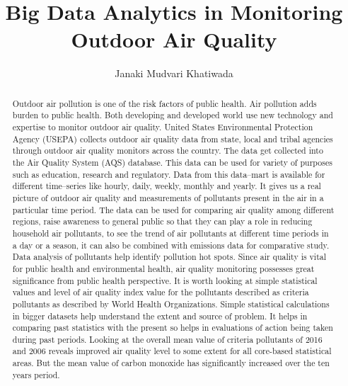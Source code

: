 \documentclass[sigconf]{acmart}
\begin{document}
\title{Big Data Analytics in Monitoring  Outdoor Air Quality}


\author{Janaki Mudvari Khatiwada}






\begin{abstract}
   Outdoor air pollution is one of the risk factors of public health. Air pollution adds burden to public health. Both developing and developed world use new technology and expertise to monitor outdoor air quality. 
   United States Environmental Protection Agency (USEPA) collects outdoor air quality data from state, local and tribal agencies through outdoor air quality monitors across the country. The data get collected into the Air Quality System (AQS) database. This data can be used for variety of purposes such as education, research and regulatory. Data from this data--mart is available for different time--series like hourly, daily, weekly, monthly and yearly. It gives us a real picture of outdoor air quality and measurements of pollutants present in the air in a particular time period. The data can be used for comparing air quality among different regions, raise awareness to general public so that they can play a role in reducing household air pollutants, to see the trend of air pollutants at different time periods in a day or a season, it can also be combined with emissions data for comparative study. Data analysis of pollutants help identify pollution hot spots. Since air quality is vital for public health and environmental health, air quality monitoring possesses great significance from public health perspective. It is worth looking at simple statistical values and level of air quality index value for the pollutants described as criteria pollutants as described by World Health Organizations. Simple statistical calculations in bigger datasets help understand the extent and source of problem. It helps in comparing past statistics with the present so helps in evaluations of action being taken during past periods. Looking at the overall mean value of criteria pollutants of 2016 and 2006 reveals improved air quality level to some extent for all core-based statistical areas. But the mean value of carbon monoxide has significantly increased over the ten years period.


\end{abstract}
\end{document}
